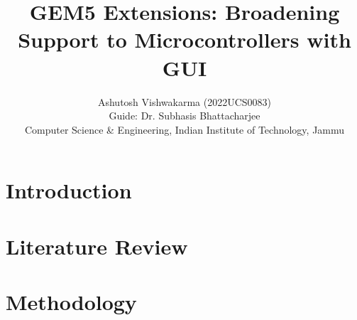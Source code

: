 \documentclass[conference]{IEEEtran}
\begin{document}
\title{GEM5 Extensions: Broadening Support to Microcontrollers with GUI}

\author{Ashutosh Vishwakarma (2022UCS0083)\\
	Guide: Dr. Subhasis Bhattacharjee\\
	Computer Science \& Engineering,
	Indian Institute of Technology, Jammu}


\maketitle

\newpage

\begin{abstract}
	
\end{abstract}

\section{Introduction}


\section{Literature Review}


\section{Methodology}


% 

% 



\end{document}
